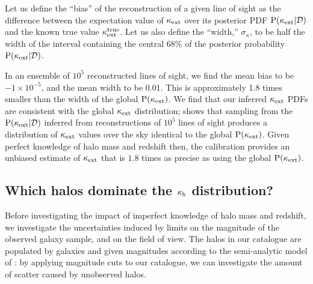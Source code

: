 \documentclass[useAMS,usenatbib,a4paper]{mn2e}
\begin{document}
Let us define the ``bias'' of the reconstruction of a given line of sight as
the difference between the expectation value of $\kappa_{\rm ext}$ over its posterior
PDF ${\rm P}(\kappa_{\rm ext}|{\mathcal{D}})$ and the known true value $\kappa_{\rm ext}^{\mathrm{true}}$.
Let us also define the ``width,'' $\sigma_{\kappa}$, to be half the width of
the interval containing the central $68\%$ of the posterior probability
${\rm P}(\kappa_{\rm ext}|{\mathcal{D}})$. 

In an ensemble of $10^{5}$ reconstructed lines of sight, we find the mean bias
to be $-1\times 10^{-5}$, and the mean width to be 0.01. This is approximately
1.8 times smaller than the width of the global ${\rm P}(\kappa_{\rm ext})$.  We find that
our inferred $\kappa_{\rm ext}$ PDFs are consistent with the global $\kappa_{\rm ext}$
distribution;  shows that sampling from the
${\rm P}(\kappa_{\rm ext}|{\mathcal{D}})$ inferred from reconstructions of  $10^{5}$ lines of
sight  produces a distribution of $\kappa_{\rm ext}$ values over the sky identical to
the global ${\rm P}(\kappa_{\rm ext})$. Given perfect knowledge of halo mass and redshift
then, the calibration \proceedure provides an unbiased estimate of $\kappa_{\rm ext}$
that is $1.8$ times as precise as using the global ${\rm P}(\kappa_{\rm ext})$. 


\subsection{Which halos dominate the $\kappa_{\rm h}$ distribution?}

Before investigating the impact of imperfect knowledge of halo
mass and redshift, we investigate the uncertainties induced by limits on the
magnitude of the observed galaxy sample, and on the field of view. The halos
in our catalogue are populated by galaxies and given magnitudes according to
the semi-analytic model of \citet{DeLucia+Blaizot2007}: by applying magnitude
cuts to our catalogue, we can investigate the amount of scatter caused by
unobserved halos. 
\end{document}
